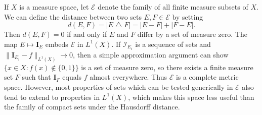 \begin{remark}
	If $X$ is a measure space, let $\mathcal{E}$ denote the family of all finite measure subsets of $X$. We can define the distance between two sets $E,F \in \mathcal{E}$ by setting
	\[ d(E,F) = |E \bigtriangleup F| = |E - F| + |F - E|. \]
	Then $d(E,F) = 0$ if and only if $E$ and $F$ differ by a set of measure zero. The map $E \mapsto \mathbf{I}_E$ embeds $\mathcal{E}$ in $L^1(X)$. If $\mathcal{I}_{E_i}$ is a sequence of sets and $\| \mathbf{I}_{E_i} - f \|_{L^1(X)} \to 0$, then a simple approximation argument can show $\{ x \in X: f(x) \not \in \{ 0, 1 \} \}$ is a set of measure zero, so there exists a finite measure set $F$ such that $\mathbf{I}_F$ equals $f$ almost everywhere. Thus $\mathcal{E}$ is a complete metric space. However, most properties of sets which can be tested generically in $\mathcal{E}$ also tend to extend to properties in $L^1(X)$, which makes this space less useful than the family of compact sets under the Hausdorff distance.
\end{remark}












